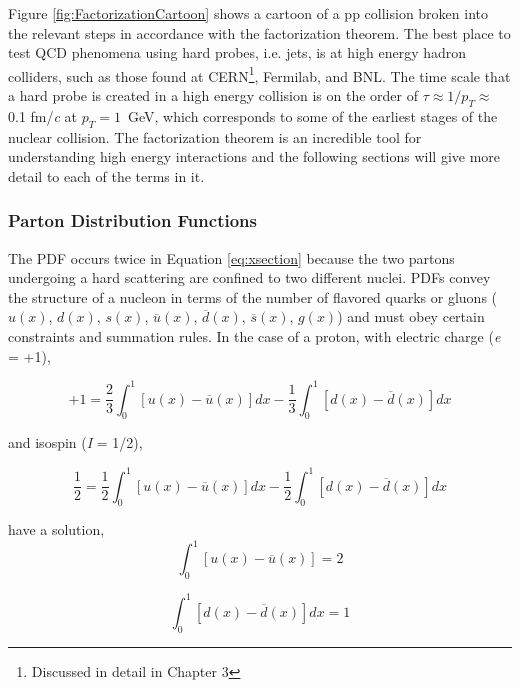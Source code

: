 \noindent
Figure \ref{fig:FactorizationCartoon} shows a cartoon of a pp collision broken into the relevant steps in accordance with the factorization theorem.  The best place to test QCD phenomena using hard probes, i.e. jets, is at high energy hadron colliders, such as those found at CERN\footnote{Discussed in detail in Chapter 3}, Fermilab, and BNL. The time scale that a hard probe is created in a high energy collision is on the order of $\tau \approx 1/p_{T} \approx$ \, 0.1 fm/\textit{c} at $p_{T} = 1 \,$ GeV, which corresponds to some of the earliest stages of the nuclear collision.  The factorization theorem is an incredible tool for understanding high energy interactions and the following sections will give more detail to each of the terms in it.

\subsubsection{Parton Distribution Functions}
The PDF occurs twice in Equation \ref{eq:xsection} because the two partons undergoing a hard scattering are confined to two different nuclei.  PDFs convey the structure of a nucleon in terms of the number of flavored quarks or gluons ($u(x)$, $d(x)$, $s(x)$, $\overline{u}(x)$, $\overline{d}(x)$, $\overline{s}(x)$, $g(x)$) and must obey certain constraints and summation rules.  In the case of a proton, with electric charge (\textit{e} = +1),

\begin{equation}
+1 = \frac{2}{3} \int_{0}^{1} [u(x) - \overline{u}(x)] dx - \frac{1}{3} \int^{1}_{0} [d(x) - \overline{d}(x)] dx
\label{eq:PDFcharge}
\end{equation}

\noindent
and isospin (\textit{I} = 1/2),

\begin{equation}
\frac{1}{2} = \frac{1}{2} \int_{0}^{1} [u(x) - \overline{u}(x)] dx - \frac{1}{2} \int^{1}_{0} [d(x) - \overline{d}(x)] dx
\label{eq:PDFIso}
\end{equation}

\noindent
have a solution,
\begin{equation}
 \int_{0}^{1} [u(x) - \overline{u}(x)] = 2
\label{eq:PDFSouU}
\end{equation}

\begin{equation}
\int^{1}_{0} [d(x) - \overline{d}(x)] dx = 1
\label{eq:PDFSouD}
\end{equation}

